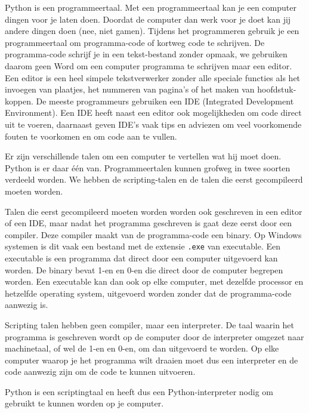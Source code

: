 Python is een programmeertaal. Met een programmeertaal kan je een computer dingen voor je laten doen. Doordat de computer dan werk voor je doet kan jij andere dingen doen (nee, niet gamen). Tijdens het programmeren gebruik je een programmeertaal om programma-code of kortweg code te schrijven. De programma-code schrijf je in een tekst-bestand zonder opmaak, we gebruiken daarom geen Word om een computer programma te schrijven maar een editor. Een editor is een heel simpele tekstverwerker zonder alle speciale functies als het invoegen van plaatjes, het nummeren van pagina's of het maken van hoofdstuk-koppen. De meeste programmeurs gebruiken een IDE (Integrated Development Environment). Een IDE heeft naast een editor ook mogelijkheden om code direct uit te voeren, daarnaast geven IDE's vaak tips en adviezen om veel voorkomende fouten te voorkomen en om code aan te vullen.

Er zijn verschillende talen om een computer te vertellen wat hij moet doen. Python is er daar \'e\'en van. Programmeertalen kunnen grofweg in twee soorten verdeeld worden. We hebben de scripting-talen en de talen die eerst gecompileerd moeten worden.

Talen die eerst gecompileerd moeten worden worden ook geschreven in een editor of een IDE, maar nadat het programma geschreven is gaat deze eerst door een compiler. Deze compiler maakt van de programma-code een binary. Op Windows systemen is dit vaak een bestand met de extensie \texttt{.exe} van executable. Een executable is een programma dat direct door een computer uitgevoerd kan worden. De binary bevat 1-en en 0-en die direct door de computer begrepen worden. Een executable kan dan ook op elke computer, met dezelfde processor en hetzelfde operating system, uitgevoerd worden zonder dat de programma-code aanwezig is.

Scripting talen hebben geen compiler, maar een interpreter. De taal waarin het programma is geschreven wordt op de computer door de interpreter omgezet naar machinetaal, of wel de 1-en en 0-en, om dan uitgevoerd te worden. Op elke computer waarop je het programma wilt draaien moet dus een interpreter en de code aanwezig zijn om de code te kunnen uitvoeren.

Python is een scriptingtaal en heeft dus een Python-interpreter nodig om gebruikt te kunnen worden op je computer.

